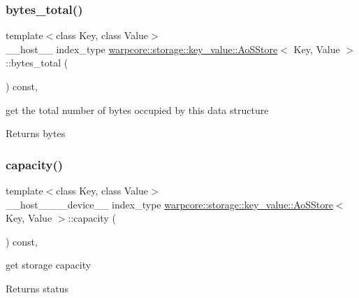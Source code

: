 \subsubsection{\texorpdfstring{bytes\+\_\+total()}{bytes\_total()}}
{\footnotesize\ttfamily template$<$class Key, class Value$>$ \\
\+\_\+\+\_\+host\+\_\+\+\_\+ index\+\_\+type \hyperlink{classwarpcore_1_1storage_1_1key__value_1_1AoSStore}{warpcore\+::storage\+::key\+\_\+value\+::\+Ao\+S\+Store}$<$ Key, Value $>$\+::bytes\+\_\+total (\begin{DoxyParamCaption}{ }\end{DoxyParamCaption}) const\hspace{0.3cm}{\ttfamily [inline]}, {\ttfamily [noexcept]}}



get the total number of bytes occupied by this data structure 

\begin{DoxyReturn}{Returns}
bytes 
\end{DoxyReturn}
\mbox{\label{classwarpcore_1_1storage_1_1key__value_1_1AoSStore_a23c4cb728f870dfa09a0d0d976cedf8e}} 
\subsubsection{\texorpdfstring{capacity()}{capacity()}}
{\footnotesize\ttfamily template$<$class Key, class Value$>$ \\
\+\_\+\+\_\+host\+\_\+\+\_\+\+\_\+\+\_\+device\+\_\+\+\_\+ index\+\_\+type \hyperlink{classwarpcore_1_1storage_1_1key__value_1_1AoSStore}{warpcore\+::storage\+::key\+\_\+value\+::\+Ao\+S\+Store}$<$ Key, Value $>$\+::capacity (\begin{DoxyParamCaption}{ }\end{DoxyParamCaption}) const\hspace{0.3cm}{\ttfamily [inline]}, {\ttfamily [noexcept]}}



get storage capacity 

\begin{DoxyReturn}{Returns}
status 
\end{DoxyReturn}
\mbox{\label{classwarpcore_1_1storage_1_1key__value_1_1AoSStore_abd88eb047b4435c11bb639df0e2fd7ee}} 
